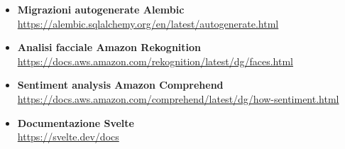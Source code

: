 \begin{itemize}
	\item 
	{\textbf{Migrazioni autogenerate Alembic}}\\\url{https://alembic.sqlalchemy.org/en/latest/autogenerate.html}
	\item 
	{\textbf{Analisi facciale Amazon Rekognition}}\\\url{https://docs.aws.amazon.com/rekognition/latest/dg/faces.html}
	\item 
	{\textbf{Sentiment analysis Amazon Comprehend}}\\\url{https://docs.aws.amazon.com/comprehend/latest/dg/how-sentiment.html}
	\item 
	{\textbf{Documentazione Svelte}}\\\url{https://svelte.dev/docs}
\end{itemize}
